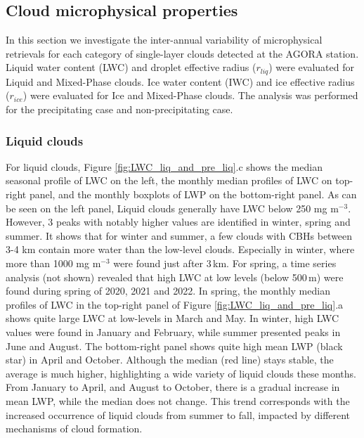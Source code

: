 \subsection{Cloud microphysical properties}\label{sec:cloud_microphys}

In this section we investigate the inter-annual variability of microphysical retrievals for each category of single-layer clouds detected at the AGORA station. Liquid water content (LWC) and droplet effective radius ($r_{liq}$) were evaluated for Liquid and Mixed-Phase clouds. Ice water content (IWC) and ice effective radius ($r_{ice}$) were evaluated for Ice and Mixed-Phase clouds. The analysis was performed for the precipitating case and non-precipitating case.

\subsubsection{Liquid clouds}

For liquid clouds, Figure \ref{fig:LWC_liq_and_pre_liq}.c shows the median seasonal profile of LWC on the left, the monthly median profiles of LWC on top-right panel, and the monthly boxplots of LWP on the bottom-right panel. As can be seen on the left panel, Liquid clouds generally have LWC below 250 mg m$^{-3}$. However, 3 peaks with notably higher values are identified in winter, spring and summer. It shows that for winter and summer, a few clouds with CBHs between 3-4 km contain more water than the low-level clouds. Especially in winter, where more than 1000 mg m$^{-3}$ were found just after 3\,km. For spring, a time series analysis (not shown) revealed that high LWC at low levels (below 500\,m) were found during spring of 2020, 2021 and 2022. In spring, the monthly median profiles of LWC in the top-right panel of Figure \ref{fig:LWC_liq_and_pre_liq}.a shows quite large LWC at low-levels in March and May. In winter, high LWC values were found in January and February, while summer presented peaks in June and August. The bottom-right panel shows quite high mean LWP (black star) in April and October. Although the median (red line) stays stable, the average is much higher, highlighting a wide variety of liquid clouds these months. From January to April, and August to October, there is a gradual increase in mean LWP, while the median does not change. This trend corresponds with the increased occurrence of liquid clouds from summer to fall, impacted by different mechanisms of cloud formation.


